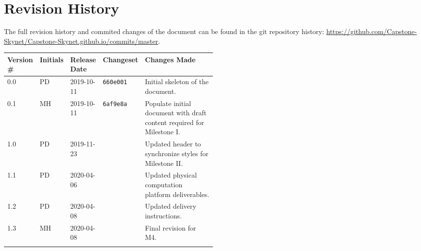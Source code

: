 \section*{Revision History}
The full revision history and commited changes of the document can be found in the git repository history: \href{https://github.com/Capstone-Skynet/Capstone-Skynet.github.io}{https://github.com/Capstone-Skynet/Capstone-Skynet.github.io/commits/master}.

\begin{table}[H]
\begin{tabular}{*{4}{l}p{0.5\linewidth}}
\hline
Version \# & Initials & Release Date & Changeset & Changes Made \\ \hline

0.0 & PD & 2019-10-11 & \texttt{660e001} & Initial skeleton of the document.\\
0.1 & MH & 2019-10-11 & \texttt{6af9e8a} & Populate initial document with draft content required for Milestone I.\\
1.0 & PD & 2019-11-23 & \texttt{} & Updated header to synchronize styles for Milestone II.\\
1.1 & PD & 2020-04-06 & \texttt{} & Updated physical computation platform deliverables.\\
1.2 & PD & 2020-04-08 & \texttt{} & Updated delivery instructions.\\
1.3 & MH & 2020-04-08 & \texttt{} & Final revision for M4.\\
 & & & \\ \hline
\end{tabular}
\end{table}